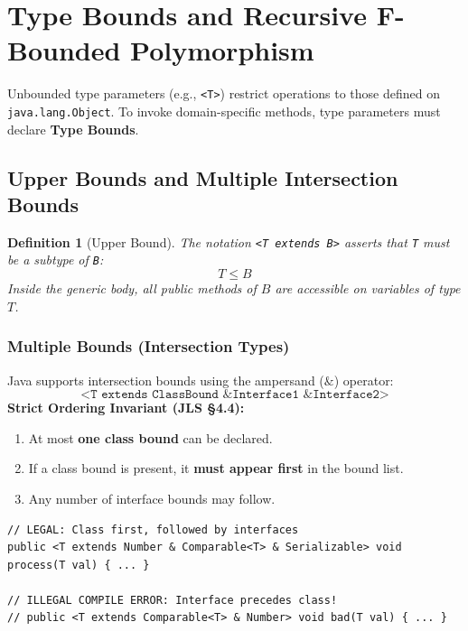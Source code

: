 \documentclass[10pt,journal,compsoc,onecolumn]{IEEEtran}
\newtheorem{definition}[theorem]{Definition}
\begin{document}
\section{Type Bounds and Recursive F-Bounded Polymorphism}
\label{sec:bounds}

Unbounded type parameters (e.g., \texttt{<T>}) restrict operations to those defined on \texttt{java.lang.Object}. To invoke domain-specific methods, type parameters must declare \textbf{Type Bounds}.

\subsection{Upper Bounds and Multiple Intersection Bounds}
\begin{definition}[Upper Bound]
The notation \texttt{<T extends B>} asserts that \texttt{T} must be a subtype of \texttt{B}:
\begin{equation}
T \le B
\end{equation}
Inside the generic body, all public methods of $B$ are accessible on variables of type $T$.
\end{definition}

\subsubsection{Multiple Bounds (Intersection Types)}
Java supports intersection bounds using the ampersand ($\&$) operator:
\begin{equation}
\texttt{<T extends ClassBound \& Interface1 \& Interface2>}
\end{equation}
\textbf{Strict Ordering Invariant (JLS \S4.4):}
\begin{enumerate}
    \item At most \textbf{one class bound} can be declared.
    \item If a class bound is present, it \textbf{must appear first} in the bound list.
    \item Any number of interface bounds may follow.
\end{enumerate}
\begin{lstlisting}
// LEGAL: Class first, followed by interfaces
public <T extends Number & Comparable<T> & Serializable> void process(T val) { ... }

// ILLEGAL COMPILE ERROR: Interface precedes class!
// public <T extends Comparable<T> & Number> void bad(T val) { ... }
\end{lstlisting}
\end{document}
